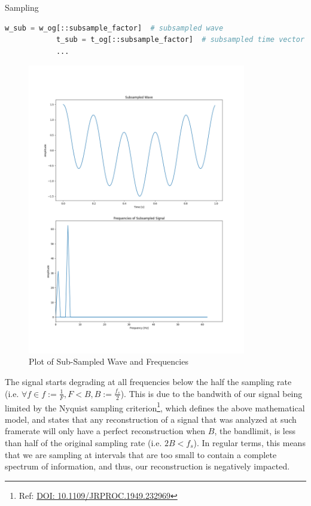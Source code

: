 \begin{hwkProblem}{6.5}{Sampling}
\begin{lstlisting}[language=python]
			w_sub = w_og[::subsample_factor]  # subsampled wave
			t_sub = t_og[::subsample_factor]  # subsampled time vector
			...
	\end{lstlisting}

	\newpage
	\solpart

	\begin{figure}[ht!]
	  \centering
	  \includegraphics[width=0.85\textwidth]{./6.5.3.png}
	  \caption{Plot of Sub-Sampled Wave and Frequencies}
	\end{figure}

	\newpage
	\solpart
	\linebreak
	
	The signal starts degrading at all frequencies below the half the sampling rate (i.e. \( \forall f \in f := \frac{1}{F}, F < B, B := \frac{f_s}{2} \)). This is due to the bandwith of our signal being limited by the Nyquist sampling criterion\footnote{Ref: \href{https://doi.org/10.1109/JRPROC.1949.232969}{DOI: 10.1109/JRPROC.1949.232969}}, which defines the above mathematical model, and states that any reconstruction of a signal that was analyzed at such framerate will only have a perfect reconstruction when \( B \), the bandlimit, is less than half of the original sampling rate (i.e. \( 2B < f_s \)). In regular terms, this means that we are sampling at intervals that are too small to contain a complete spectrum of information, and thus, our reconstruction is negatively impacted.
	
\end{hwkProblem}


